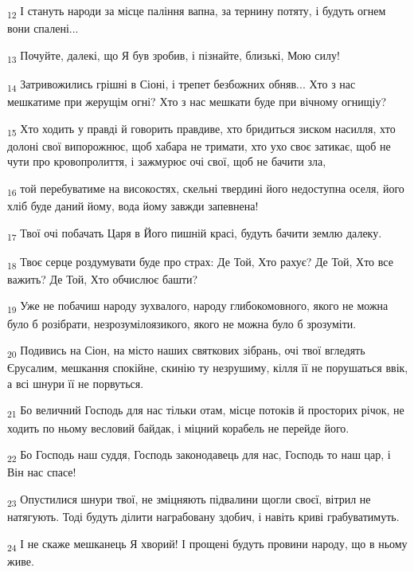 \begin{tcolorbox}
\textsubscript{12} І стануть народи за місце паління вапна, за тернину потяту, і будуть огнем вони спалені...
\end{tcolorbox}
\begin{tcolorbox}
\textsubscript{13} Почуйте, далекі, що Я був зробив, і пізнайте, близькі, Мою силу!
\end{tcolorbox}
\begin{tcolorbox}
\textsubscript{14} Затривожились грішні в Сіоні, і трепет безбожних обняв... Хто з нас мешкатиме при жерущім огні? Хто з нас мешкати буде при вічному огнищіу?
\end{tcolorbox}
\begin{tcolorbox}
\textsubscript{15} Хто ходить у правді й говорить правдиве, хто бридиться зиском насилля, хто долоні свої випорожнює, щоб хабара не тримати, хто ухо своє затикає, щоб не чути про кровопролиття, і зажмурює очі свої, щоб не бачити зла,
\end{tcolorbox}
\begin{tcolorbox}
\textsubscript{16} той перебуватиме на високостях, скельні твердині його недоступна оселя, його хліб буде даний йому, вода йому завжди запевнена!
\end{tcolorbox}
\begin{tcolorbox}
\textsubscript{17} Твої очі побачать Царя в Його пишній красі, будуть бачити землю далеку.
\end{tcolorbox}
\begin{tcolorbox}
\textsubscript{18} Твоє серце роздумувати буде про страх: Де Той, Хто рахує? Де Той, Хто все важить? Де Той, Хто обчислює башти?
\end{tcolorbox}
\begin{tcolorbox}
\textsubscript{19} Уже не побачиш народу зухвалого, народу глибокомовного, якого не можна було б розібрати, незрозумілоязикого, якого не можна було б зрозуміти.
\end{tcolorbox}
\begin{tcolorbox}
\textsubscript{20} Подивись на Сіон, на місто наших святкових зібрань, очі твої вгледять Єрусалим, мешкання спокійне, скинію ту незрушиму, кілля її не порушаться ввік, а всі шнури її не порвуться.
\end{tcolorbox}
\begin{tcolorbox}
\textsubscript{21} Бо величний Господь для нас тільки отам, місце потоків й просторих річок, не ходить по ньому весловий байдак, і міцний корабель не перейде його.
\end{tcolorbox}
\begin{tcolorbox}
\textsubscript{22} Бо Господь наш суддя, Господь законодавець для нас, Господь то наш цар, і Він нас спасе!
\end{tcolorbox}
\begin{tcolorbox}
\textsubscript{23} Опустилися шнури твої, не зміцняють підвалини щогли своєї, вітрил не натягують. Тоді будуть ділити награбовану здобич, і навіть криві грабуватимуть.
\end{tcolorbox}
\begin{tcolorbox}
\textsubscript{24} І не скаже мешканець Я хворий! І прощені будуть провини народу, що в ньому живе.
\end{tcolorbox}
